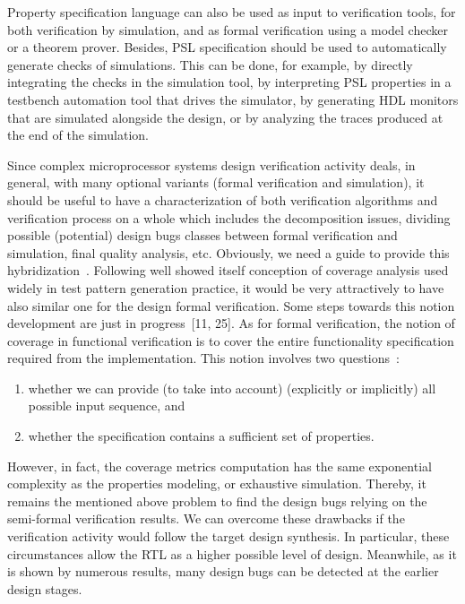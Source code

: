 \begin{multicols}{2}
    Property specification language can also be used as input
to verification tools, for both verification by simulation, and as formal
verification using a model checker or a theorem prover. Besides, PSL specification should be used to
automatically generate checks of simulations. This can be done, for example, by directly integrating the checks
in the simulation tool, by interpreting PSL properties in a testbench automation tool that drives the simulator, by
generating HDL monitors that are simulated alongside the design, or by analyzing the traces produced at the end
of the simulation.

Since complex microprocessor systems design veri\-fi\-cation activity deals, in general, with many optional
variants (formal verification and simulation), it should be useful to have a characterization of both verification
algorithms and verification process on a whole which includes the decomposition issues, dividing possible
(potential) design bugs classes between formal verification and simulation, final quality analysis, etc. Obviously,
we need a guide to provide this hybridization~\cite{3bar}. Following well showed itself conception of coverage
analysis used widely in test pattern generation practice, it would be very attractively to have also similar one for
the design formal verification. Some steps towards this notion development are just in progress~[11, 25]. 
As for formal verification, the notion of coverage in functional verification is to cover the entire
functionality specification required from the implementation. This notion involves two questions~\cite{25bar}:
    \begin{enumerate}[(1)]
\item whether we can provide (to take into account) (explicitly or implicitly) all possible input sequence,
and
\item whether the specification contains a sufficient set of properties.
\end{enumerate}

    However, in fact, the coverage metrics computation has the same exponential complexity as the properties
modeling, or exhaustive simulation. Thereby, it remains the mentioned above problem to find the design bugs
relying on the semi-formal verification results. We can overcome these drawbacks
if the verification activity
would follow the target design synthesis. In particular, these circumstances allow the RTL as a higher possible
level of design. Meanwhile, as it is shown by numerous results, many design bugs can be detected at the earlier
design stages.


\end{multicols}
